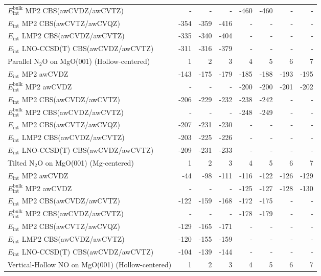\begin{longtable}{lrrrrrrr}
$E_\textrm{int}^\textrm{bulk}$ MP2 CBS(awCVDZ/awCVTZ) & - & - & - & -460 & -460 & - & - \\
$E_\textrm{int}$ MP2 CBS(awCVTZ/awCVQZ) & -354 & -359 & -416 & - & - & - & - \\
$E_\textrm{int}$ LMP2 CBS(awCVDZ/awCVTZ) & -335 & -340 & -404 & - & - & - & - \\
$E_\textrm{int}$ LNO-CCSD(T) CBS(awCVDZ/awCVTZ) & -311 & -316 & -379 & - & - & - & - \\
\toprule
Parallel N$_2$O on MgO(001) (Hollow-centered) & 1 & 2 & 3 & 4 & 5 & 6 & 7 \\ 
\midrule
$E_\textrm{int}$ MP2 awCVDZ & -143 & -175 & -179 & -185 & -188 & -193 & -195 \\
$E_\textrm{int}^\textrm{bulk}$ MP2 awCVDZ & - & - & - & -200 & -200 & -201 & -202 \\
$E_\textrm{int}$ MP2 CBS(awCVDZ/awCVTZ) & -206 & -229 & -232 & -238 & -242 & - & - \\
$E_\textrm{int}^\textrm{bulk}$ MP2 CBS(awCVDZ/awCVTZ) & - & - & - & -248 & -249 & - & - \\
$E_\textrm{int}$ MP2 CBS(awCVTZ/awCVQZ) & -207 & -231 & -230 & - & - & - & - \\
$E_\textrm{int}$ LMP2 CBS(awCVDZ/awCVTZ) & -203 & -225 & -226 & - & - & - & - \\
$E_\textrm{int}$ LNO-CCSD(T) CBS(awCVDZ/awCVTZ) & -209 & -231 & -233 & - & - & - & - \\
\toprule
Tilted N$_2$O on MgO(001) (Mg-centered) & 1 & 2 & 3 & 4 & 5 & 6 & 7 \\ 
\midrule
$E_\textrm{int}$ MP2 awCVDZ & -44 & -98 & -111 & -116 & -122 & -126 & -129 \\
$E_\textrm{int}^\textrm{bulk}$ MP2 awCVDZ & - & - & - & -125 & -127 & -128 & -130 \\
$E_\textrm{int}$ MP2 CBS(awCVDZ/awCVTZ) & -122 & -159 & -168 & -172 & -175 & - & - \\
$E_\textrm{int}^\textrm{bulk}$ MP2 CBS(awCVDZ/awCVTZ) & - & - & - & -178 & -179 & - & - \\
$E_\textrm{int}$ MP2 CBS(awCVTZ/awCVQZ) & -129 & -165 & -171 & - & - & - & - \\
$E_\textrm{int}$ LMP2 CBS(awCVDZ/awCVTZ) & -120 & -155 & -159 & - & - & - & - \\
$E_\textrm{int}$ LNO-CCSD(T) CBS(awCVDZ/awCVTZ) & -104 & -139 & -144 & - & - & - & - \\
\toprule
Vertical-Hollow NO on MgO(001) (Hollow-centered) & 1 & 2 & 3 & 4 & 5 & 6 & 7 \\ 

\end{longtable}
